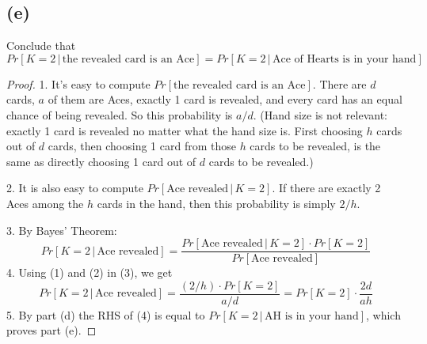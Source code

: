 \documentclass[14pt]{extarticle}
\begin{document}
\subsection{(e)}
Conclude that
$$
Pr[K = 2 \,|\, \text{the revealed card is an Ace}] = Pr[K = 2 \,|\, \text{Ace of Hearts is in your hand}]
$$
\begin{proof}
1. It's easy to compute $Pr[\text{the revealed card is an Ace}]$. There are $d$ cards, $a$ of them are Aces, exactly 1 card is revealed, and every card has an equal chance of being revealed. So this probability is $a/d$. (Hand size is not relevant: exactly 1 card is revealed no matter what the hand size is. First choosing $h$ cards out of $d$ cards, then choosing 1 card from those $h$ cards to be revealed, is the same as directly choosing 1 card out of $d$ cards to be revealed.)

2. It is also easy to compute $Pr[\text{Ace revealed}\,|\,K = 2]$. If there are exactly 2 Aces among the $h$ cards in the hand, then this probability is simply $2/h$.

3. By Bayes' Theorem:
$$
Pr[K = 2 \,|\, \text{Ace revealed}] = \frac{Pr[ \text{Ace revealed}\,|\,K = 2] \cdot Pr[K = 2]}{Pr[\text{Ace revealed}]}
$$
4. Using (1) and (2) in (3), we get
$$
Pr[K = 2 \,|\, \text{Ace revealed}] = \frac{(2/h) \cdot Pr[K = 2]}{a/d} = Pr[K=2] \cdot \frac{2d}{ah}
$$
5. By part (d) the RHS of (4) is equal to $Pr[K = 2 \,|\, \text{AH is in your hand}]$, which proves part (e).
\end{proof}
\end{document}

